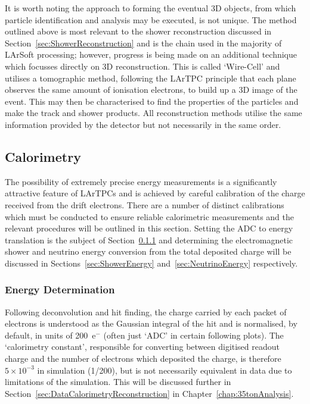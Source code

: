 It is worth noting the approach to forming the eventual 3D objects, from which particle identification and analysis may be executed, is not unique.  The method outlined above is most relevant to the shower reconstruction discussed in Section~\ref{sec:ShowerReconstruction} and is the chain used in the majority of LArSoft processing; however, progress is being made on an additional technique which focusses directly on 3D reconstruction.  This is called `Wire-Cell' \cite{WireCellWebsite} and utilises a tomographic method, following the LArTPC principle that each plane observes the same amount of ionisation electrons, to build up a 3D image of the event.  This may then be characterised to find the properties of the particles and make the track and shower products.  All reconstruction methods utilise the same information provided by the detector but not necessarily in the same order.

\subsection{Calorimetry}\label{sec:Calorimetry}

The possibility of extremely precise energy measurements is a significantly attractive feature of LArTPCs and is achieved by careful calibration of the charge received from the drift electrons.  There are a number of distinct calibrations which must be conducted to ensure reliable calorimetric measurements and the relevant procedures will be outlined in this section.  Setting the ADC to energy translation is the subject of Section~\ref{sec:EnergyDetermination} and determining the electromagnetic shower and neutrino energy conversion from the total deposited charge will be discussed in Sections~\ref{sec:ShowerEnergy} and~\ref{sec:NeutrinoEnergy} respectively.

\subsubsection{Energy Determination}\label{sec:EnergyDetermination}

Following deconvolution and hit finding, the charge carried by each packet of electrons is understood as the Gaussian integral of the hit and is normalised, by default, in units of 200~e$^-$ (often just `ADC' in certain following plots).  The `calorimetry constant', responsible for converting between digitised readout charge and the number of electrons which deposited the charge, is therefore $5\times10^{-3}$ in simulation (1/200), but is not necessarily equivalent in data due to limitations of the simulation.  This will be discussed further in Section~\ref{sec:DataCalorimetryReconstruction} in Chapter~\ref{chap:35tonAnalysis}.

